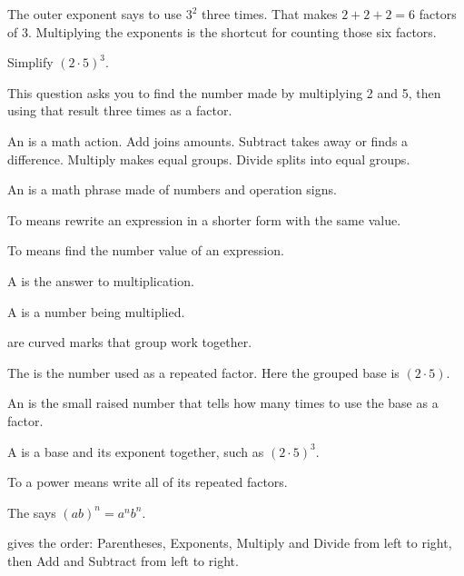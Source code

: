 
The outer exponent says to use $3^{2}$ three times. That makes $2 + 2 + 2 = 6$
factors of 3. Multiplying the exponents is the shortcut for counting those six
factors.


Simplify $(2 \cdot 5)^{3}$.


This question asks you to find the number made by multiplying 2 and 5, then
using that result three times as a factor.

\begin{words}
  \item An is a math action. Add joins amounts. Subtract takes
    away or finds a difference. Multiply makes equal groups. Divide splits into
    equal groups.
  \item An is a math phrase made of numbers and operation signs.
  \item To means rewrite an expression in a shorter form with the
    same value.
  \item To means find the number value of an expression.
  \item A is the answer to multiplication.
  \item A is a number being multiplied.
  \item {}are curved marks that group work together.
  \item The is the number used as a repeated factor. Here the grouped
    base is $(2 \cdot 5)$.
  \item An is the small raised number that tells how many times to
    use the base as a factor.
  \item A is a base and its exponent together, such as
    $(2 \cdot 5)^{3}$.
  \item To a power means write all of its repeated factors.
  \item The says $(ab)^{n} = a^{n}b^{n}$.
  \item {}gives the order: Parentheses, Exponents, Multiply and Divide
    from left to right, then Add and Subtract from left to right.
\end{words}

